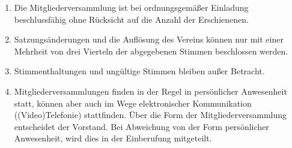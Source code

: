 \documentclass[12pt,a4paper,draft]{article}
\begin{document}
\begin{enumerate}
\item Die Mitgliederversammlung ist bei ordnungsgemäßer Einladung 
beschlussfähig ohne Rücksicht auf die Anzahl der Erschienenen.

\item Satzungsänderungen und die Auflösung des Vereins können nur mit einer 
Mehrheit von drei Vierteln der abgegebenen Stimmen beschlossen werden. 

\item Stimmenthaltungen und ungültige Stimmen bleiben außer Betracht.

\item Mitgliederversammlungen finden in der Regel in persönlicher Anwesenheit statt, können aber
auch im Wege elektronischer Kommunikation ((Video)Telefonie) stattfinden. Über die Form der
Mitgliederversammlung entscheidet der Vorstand. Bei Abweichung von der Form persönlicher
Anwesenheit, wird dies in der Einberufung mitgeteilt.
\end{enumerate}
\end{document}
